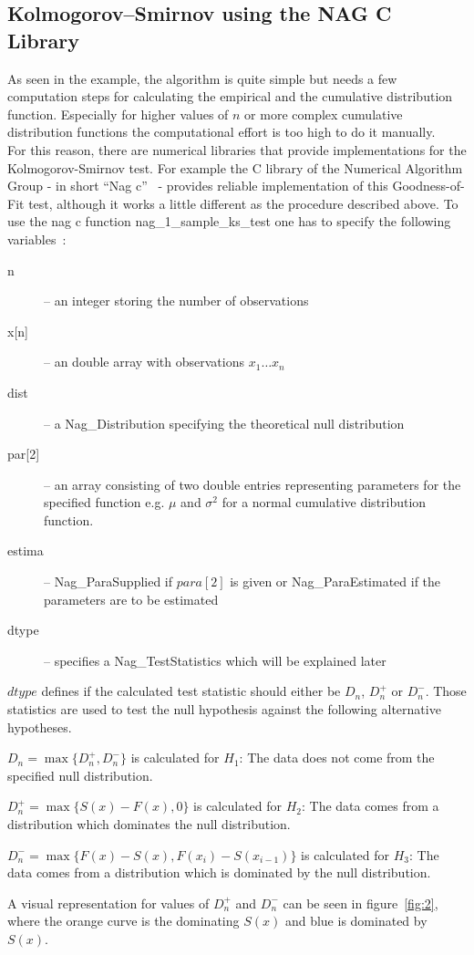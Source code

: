\documentclass{article}
\theoremstyle{definition}
\begin{document}
\subsection{Kolmogorov–Smirnov using the NAG C Library}
As seen in the example, the algorithm is quite simple but needs a few computation steps for calculating the empirical and the cumulative distribution function.
Especially for higher values of $n$ or more complex cumulative distribution functions the computational effort is too high to do it manually.\\
For this reason, there are numerical libraries that provide implementations for the Kolmogorov-Smirnov test. For example the C library of the Numerical Algorithm Group - in short ``Nag c''~\cite{nagc} - provides reliable implementation of this Goodness-of-Fit test, although it works a little different as the procedure described above.
To use the nag c function nag\_1\_sample\_ks\_test one has to specify the following variables~\cite{nagcKS}:
\begin{description}
\item[n] -- an integer storing the number of observations
\item[x{[n]}] -- an double array with observations $x_1 … x_n$
\item[dist] -- a Nag\_Distribution specifying the theoretical null distribution
\item[par{[2]}] -- an array consisting of two double entries representing parameters for the specified function e.g. $\mu$ and $\sigma^2$ for a normal cumulative distribution function.
\item[estima] -- Nag\_ParaSupplied if $para[2]$ is given or Nag\_ParaEstimated if the parameters are to be estimated
\item[dtype] -- specifies a Nag\_TestStatistics which will be explained later
\end{description}
$dtype$ defines if the calculated test statistic should either be $D_n$, $D^+_n$ or $D^-_n$.
Those statistics are used to test the null hypothesis against the following alternative hypotheses.
\begin{description}
\item $D_n=\max\{D^+_n,D^-_n\}$ is calculated for $H_1 $: The data does not come from the specified null distribution.\\
\item $D^+_n=\max\{S(x)-F(x),0\}$ is calculated for $H_2$: The data comes from a distribution which dominates the null distribution.\\
\item $D^-_n=\max\{F(x)-S(x),F(x_i)-S(x_{i-1})\}$ is calculated for $H_3$: The data comes from a distribution which is dominated by the null distribution.\\
\end{description}
A visual representation for values of $D_n^+$ and $D_n^-$ can be seen in figure~\ref{fig:2}, where the orange curve is the dominating $S(x)$ and blue is dominated by $S(x)$.
\end{document}
